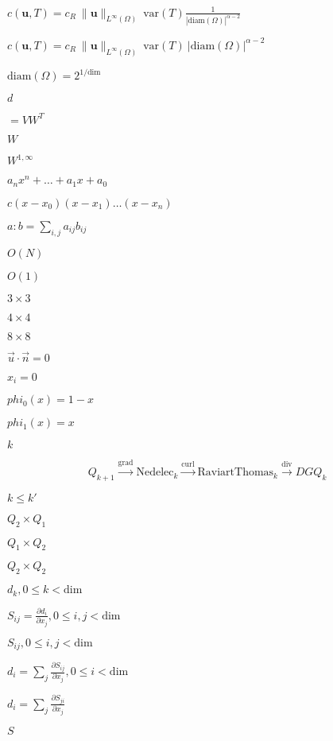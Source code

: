 \documentclass{article}
\begin{document}
$c(\mathbf{u},T) = c_R\ \|\mathbf{u}\|_{L^\infty(\Omega)} \ \mathrm{var}(T) \frac{1}{|\mathrm{diam}(\Omega)|^{\alpha-2}}$
\pagebreak

$c(\mathbf{u},T) = c_R\ \|\mathbf{u}\|_{L^\infty(\Omega)} \ \mathrm{var}(T) \ |\mathrm{diam}(\Omega)|^{\alpha-2}$
\pagebreak

$\mathrm{diam}(\Omega)=2^{1/\textrm{dim}}$
\pagebreak

$d$
\pagebreak

$= VW^T$
\pagebreak

$W$
\pagebreak

$W^{1,\infty}$
\pagebreak

$a_n x^n+\ldots+a_1 x + a_0$
\pagebreak

$c (x - x_0) (x-x_1)\ldots (x-x_n)$
\pagebreak

$a:b=\sum_{i,j} a_{ij}b_{ij}$
\pagebreak

$O(N)$
\pagebreak

$O(1)$
\pagebreak

$3 \times 3$
\pagebreak

$4 \times 4$
\pagebreak

$8 \times 8$
\pagebreak

$\vec u \cdot \vec n = 0$
\pagebreak

$x_i=0$
\pagebreak

$phi_0(x)=1-x$
\pagebreak

$phi_1(x)=x$
\pagebreak

$k$
\pagebreak

\[ Q_{k+1} \stackrel{\text{grad}}{\rightarrow} \text{Nedelec}_k \stackrel{\text{curl}}{\rightarrow} \text{RaviartThomas}_k \stackrel{\text{div}}{\rightarrow} DGQ_{k} \]
\pagebreak

$k\le k'$
\pagebreak

$Q_2\times Q_1$
\pagebreak

$Q_1\times Q_2$
\pagebreak

$Q_2\times Q_2$
\pagebreak

$d_{k}, 0\le k<\text{dim}$
\pagebreak

$S_{ij} = \frac{\partial d_{i}}{\partial x_j}, 0\le i,j<\text{dim}$
\pagebreak

$S_{ij}, 0\le i,j<\text{dim}$
\pagebreak

$d_i = \sum_j \frac{\partial S_{ij}}{\partial x_j}, 0\le i<\text{dim}$
\pagebreak

$d_i = \sum_j \frac{\partial S_{ji}}{\partial x_j}$
\pagebreak

$S$
\pagebreak
\end{document}
